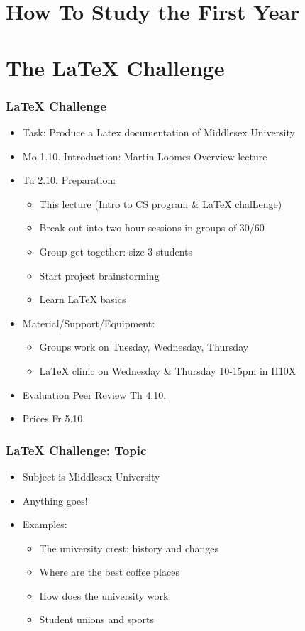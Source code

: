 \documentclass{beamer}
\begin{document}
\section{How To Study the First Year}


\section{The LaTeX Challenge}

\begin{frame}
\frametitle{LaTeX Challenge}
\begin{itemize}
\item Task: Produce a Latex documentation of Middlesex University
\item \alert{Mo 1.10.} Introduction: Martin Loomes Overview lecture
\item \alert{Tu 2.10.} Preparation:
\begin{itemize}
\item This lecture (Intro to CS program \& LaTeX chalLenge)  
\item Break out into two hour sessions in groups of 30/60 
\item Group get together: size 3 students
\item Start project brainstorming
\item Learn LaTeX basics
\end{itemize}
\item Material/Support/Equipment:
\begin{itemize}
\item Groups work on Tuesday, Wednesday, Thursday 
\item LaTeX clinic on Wednesday \& Thursday 10-15pm in H10X
\end{itemize}
\item Evaluation Peer Review \alert{Th 4.10.}
\item Prices \alert{Fr 5.10.} 
\end{itemize}
\end{frame}

\begin{frame}
\frametitle{LaTeX Challenge: Topic}
\begin{itemize}
\item Subject is Middlesex University
\item Anything goes!
\item Examples: 
\begin{itemize}
\item The university crest: history and changes
\item Where are the best coffee places
\item How does the university work
\item Student unions and sports
\end{itemize}
\end{itemize}
\end{frame}
\end{document}
